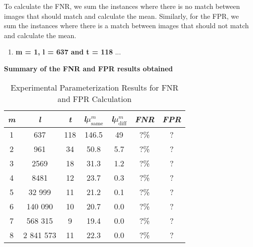 To calculate the FNR, we sum the instances where there is no match between images that should match and calculate the mean. Similarly, for the FPR, we sum the instances where there is a match between images that should not match and calculate the mean.

\begin{enumerate}
    \item \textbf{m = 1, l = 637 and t = 118}
    ...
\end{enumerate}

\textbf{Summary of the FNR and FPR results obtained}
\begin{table}[htbp] 
    \centering
    \begin{tabular}{|c|c|c|c|c|c|c|}
        \hline
        \textit{m} & \textit{l} & \textit{t} & \textit{l}\(\mu_{\text{same}}^m\) & \textit{l}\(\mu_{\text{diff}}^m\) & \textit{FNR} & \textit{FPR} \\
        \hline
        1 & 637 & 118 & 146.5 & 49 & ?\% & ? \\
        2 & 961 & 34 & 50.8 & 5.7 & ?\% & ? \\
        3 & 2569 & 18 & 31.3 & 1.2 & ?\% & ? \\
        4 & 8481 & 12 & 23.7 & 0.3 & ?\% & ? \\
        5 & 32 999 & 11 & 21.2 & 0.1 & ?\% & ? \\
        6 & 140 090 & 10 & 20.7 & 0.0 & ?\% & ? \\
        7 & 568 315 & 9 & 19.4 & 0.0 & ?\% & ? \\
        8 & 2 841 573 & 11 & 22.3 & 0.0 & ?\% & ? \\
        \hline
    \end{tabular}
    \caption{Experimental Parameterization Results for FNR and FPR Calculation}
    \label{tab:experimental_parameterization}
\end{table}


